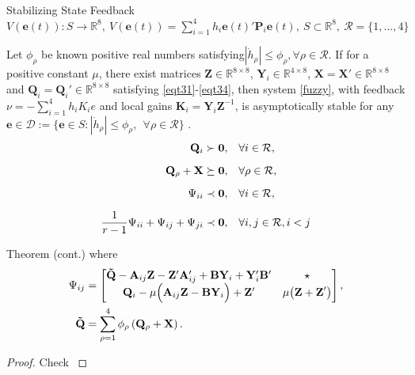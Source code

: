 \begin{frame}{Stabilizing State Feedback}
\centering
$V(\mathbf{e}(t)):S \rightarrow \mathbb{R}^8, ~
V(\mathbf{e}(t))=\sum_{i=1}^{4}h_i\mathbf{e}(t)'\mathbf{P}_i\mathbf{e}(t), ~S \subset \mathbb{R}^8, ~\mathcal{R} = \{1,...,4\}$

\begin{theorem}
Let $\phi_{\rho}$ be known positive real numbers satisfying$|\dot{h}_{\rho}|\leq \phi_{\rho},\forall \rho\in \mathcal{R}$. If for a positive constant $\mu$, there exist matrices $\mathbf{ Z}\in \mathbb{R}^{8\times 8}$, $\mathbf{ Y}_{i}\in \mathbb{R}^{4\times 8}$, $\mathbf{X}=\mathbf{X}'\in \mathbb{R}^{8\times 8}$ and $\mathbf{Q}_{i}=\mathbf{Q}_{i}'\in \mathbb{R}^{8\times 8}$ satisfying \eqref{eqt31}-\eqref{eqt34}, then system \eqref{fuzzy}, with feedback $\nu = -\sum_{i=1}^{4}h_iK_ie$ and local gains $\mathbf{K}_{i}=\mathbf{Y}_{i}\mathbf Z^{-1}$, is asymptotically stable for any $\mathbf{e} \in \mathcal{D} :=\{\mathbf{e}\in S:|\dot{h}_{\rho}|\leq \phi_{\rho},~~\forall \rho\in\mathcal{R}\}$ .
\begin{align}
\label{eqt31} {\bf Q}_i\succ {\bf 0},&\quad \forall i\in \mathcal{R},\\[2mm]
\label{eqt32} {\bf Q}_\rho+{\bf X}\succeq{\bf 0},&\quad \forall \rho\in \mathcal{R},\\[2mm]
\label{eqt33} \Psi_{ii}\prec {\bf 0},&\quad \forall i\in \mathcal{R},\\[2mm]
\label{eqt34} \frac{1}{r-1}\Psi_{ii}+\Psi_{ij}+\Psi_{ji}\prec {\bf 0},&\quad \forall i,j\in \mathcal{R}, i<j
\end{align}
\end{theorem}
\end{frame}

\begin{frame}{}
    \begin{block}{Theorem (cont.)}
    where
\begin{align*}
\Psi_{ij}&=\begin{bmatrix}
{\bf \tilde{Q}}-{\bf A}_{ij}\mathbf{Z}-\mathbf{Z}'{\bf A}_{ij}'+{\bf B}\mathbf{Y}_i+\mathbf{Y}_i'{\bf B}' & \star \\
{\bf Q}_{i}-\mu\Bigl({\bf A}_{ij}\mathbf{Z}-{\bf B}\mathbf{Y}_i\Bigr)+\mathbf{Z}' & \mu\bigl(\mathbf{Z+Z}'\bigr)
\end{bmatrix},\\
{\bf \tilde{Q}}&=\sum^{4}_{\rho=1}\phi_\rho\left({\bf Q}_\rho+{\bf X}\right).
\end{align*}
    \end{block}
    
    \begin{proof}
    Check \cite{Araujo2019a}
    \end{proof}
\end{frame}


